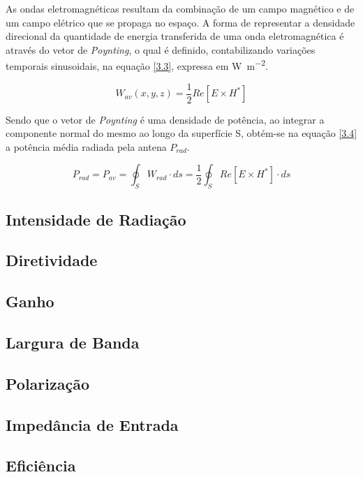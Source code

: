 As ondas eletromagnéticas resultam da combinação de um campo magnético e de um campo elétrico que se propaga no espaço. A forma de representar a densidade direcional da quantidade de energia transferida de uma onda eletromagnética é através do vetor de \textit{Poynting}, o qual é definido, contabilizando variações temporais sinusoidais, na equação \ref{3.3}, expressa em \si{\watt\per\meter\squared}.

\begin{equation} \label{3.3}
W_{av}(x,y,z)=\dfrac{1}{2}Re[E\times H^{*}]
\end{equation}

Sendo que o vetor de \textit{Poynting} é uma densidade de potência, ao integrar a componente normal do mesmo ao longo da superfície S, obtém-se na equação \ref{3.4} a potência média radiada pela antena $P_{rad}$.

\begin{equation} \label{3.4}
P_{rad}=P_{av}=\oint_S W_{rad}\cdot ds 
=\dfrac{1}{2} \oint_S Re[E\times H^{*}]\cdot ds
\end{equation}

 
\subsection*{Intensidade de Radiação}


\subsection*{Diretividade}


\subsection*{Ganho}


\subsection*{Largura de Banda}


\subsection*{Polarização}


\subsection*{Impedância de Entrada}


\subsection*{Eficiência}
